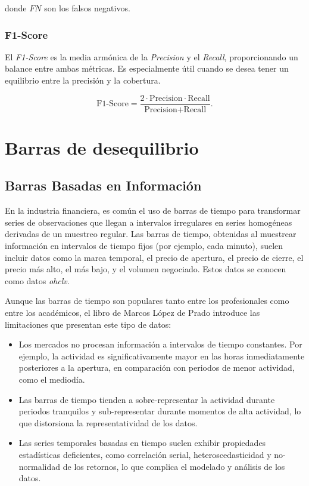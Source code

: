 \documentclass[a4paper,12pt, twoside]{report}
\begin{document}
donde $FN$ son los falsos negativos.

\subsubsection{F1-Score}

El \textit{F1-Score} es la media armónica de la \textit{Precision} y el \textit{Recall}, proporcionando un balance entre ambas métricas. Es especialmente útil cuando se desea tener un equilibrio entre la precisión y la cobertura.

\begin{equation}
\text{F1-Score} = \frac{2 \cdot \text{Precision} \cdot \text{Recall}}{\text{Precision} + \text{Recall}}.
\end{equation}

\section{Barras de desequilibrio}

\subsection{Barras Basadas en Información}

En la industria financiera, es común el uso de barras de tiempo para transformar 
series de observaciones que llegan a intervalos irregulares en series homogéneas 
derivadas de un muestreo regular. Las barras de tiempo, obtenidas al muestrear 
información en intervalos de tiempo fijos (por ejemplo, cada minuto), suelen incluir 
datos como la marca temporal, el precio de apertura, el precio de cierre, el precio 
más alto, el más bajo, y el volumen negociado. Estos datos se conocen como datos \textit{ohclv}.

Aunque las barras de tiempo son populares tanto entre los profesionales como entre los académicos, 
el libro de Marcos López de Prado introduce las limitaciones que presentan este tipo de datos:

\begin{itemize}
    \item Los mercados no procesan información a intervalos de tiempo constantes. Por ejemplo, la 
    actividad es significativamente mayor en las horas inmediatamente posteriores a la apertura, 
    en comparación con periodos de menor actividad, como el mediodía.
    \item Las barras de tiempo tienden a sobre-representar la actividad durante periodos tranquilos 
    y sub-representar durante momentos de alta actividad, lo que distorsiona la representatividad de los datos.
    \item Las series temporales basadas en tiempo suelen exhibir propiedades estadísticas deficientes, 
    como correlación serial, heteroscedasticidad y no-normalidad de los retornos, lo que complica el 
    modelado y análisis de los datos.
\end{itemize}
\end{document}
